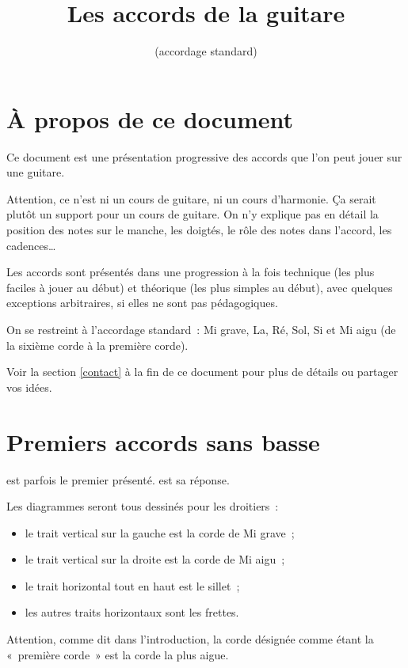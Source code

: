 \documentclass[11pt]{article}
\title{\vspace{-5em}Les accords de la guitare}
\author{(accordage standard)}
\date{}
\begin{document}
\maketitle

\setcounter{tocdepth}{2}
\tableofcontents

\section{À propos de ce document}

Ce document est une présentation progressive des accords que l’on peut jouer
sur une guitare.

Attention, ce n’est ni un cours de guitare, ni un cours d’harmonie.
Ça serait plutôt un support pour un cours de guitare. On n’y explique pas en
détail la position des notes sur le manche, les doigtés, le rôle des notes dans
l’accord, les cadences…

Les accords sont présentés dans une progression à la fois technique (les plus
faciles à jouer au début) et théorique (les plus simples au début), avec
quelques exceptions arbitraires, si elles ne sont pas pédagogiques.

On se restreint à l’accordage standard~: Mi grave, La, Ré, Sol, Si et Mi aigu
(de la sixième corde à la première corde).

Voir la section \ref{contact} à la fin de ce document pour plus de détails ou
partager vos idées.

\section{Premiers accords sans basse}

 est parfois le premier présenté.
\hspace{2em}
 est sa réponse.

Les diagrammes seront tous dessinés pour les droitiers~:

\begin{itemize}
\item le trait vertical sur la gauche est la corde de Mi grave~;
\item le trait vertical sur la droite est la corde de Mi aigu~;
\item le trait horizontal tout en haut est le sillet~;
\item les autres traits horizontaux sont les frettes.
\end{itemize}

Attention, comme dit dans l’introduction, la corde désignée comme étant la
«~première corde~» est la corde la plus aigue.
\end{document}
